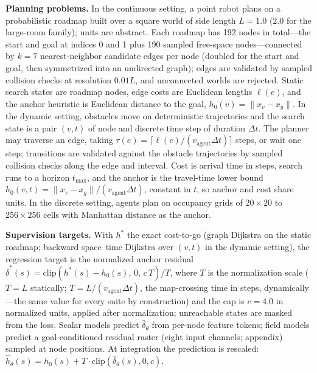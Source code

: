 \documentclass[letterpaper]{article} %
\begin{document}
\textbf{Planning problems.} In the continuous setting, a point robot plans on a probabilistic roadmap \citep[PRM;][]{kavraki1996prm} built over a square world of side length $L{=}1.0$ ($2.0$ for the large-room family); units are abstract. Each roadmap has 192 nodes in total---the start and goal at indices 0 and 1 plus 190 sampled free-space nodes---connected by $k{=}7$ nearest-neighbor candidate edges per node (doubled for the start and goal, then symmetrized into an undirected graph); edges are validated by sampled collision checks at resolution $0.01L$, and unconnected worlds are rejected. Static search states are roadmap nodes, edge costs are Euclidean lengths $\ell(e)$, and the anchor heuristic is Euclidean distance to the goal, $h_0(v) = \lVert x_v - x_g \rVert$. In the dynamic setting, obstacles move on deterministic trajectories and the search state is a pair $(v,t)$ of node and discrete time step of duration $\Delta t$. The planner may traverse an edge, taking $\tau(e) = \lceil \ell(e) / (v_{\mathrm{agent}} \Delta t) \rceil$ steps, or wait one step; transitions are validated against the obstacle trajectories by sampled collision checks along the edge and interval. Cost is arrival time in steps, search runs to a horizon $t_{\max}$, and the anchor is the travel-time lower bound $h_0(v,t) = \lVert x_v - x_g \rVert / (v_{\mathrm{agent}} \Delta t)$, constant in $t$, so anchor and cost share units. In the discrete setting, agents plan on occupancy grids of $20{\times}20$ to $256{\times}256$ cells with Manhattan distance as the anchor.

\textbf{Supervision targets.} With $h^{*}$ the exact cost-to-go (graph Dijkstra on the static roadmap; backward space--time Dijkstra over $(v,t)$ in the dynamic setting), the regression target is the normalized anchor residual $\bar\delta^{*}(s) = \mathrm{clip}\!\left(h^{*}(s) - h_0(s),\, 0,\, c\,T\right)/T$, where $T$ is the normalization scale ($T{=}L$ statically; $T = L/(v_{\mathrm{agent}}\Delta t)$, the map-crossing time in steps, dynamically---the same value for every suite by construction) and the cap is $c{=}4.0$ in normalized units, applied after normalization; unreachable states are masked from the loss. Scalar models predict $\bar\delta_\theta$ from per-node feature tokens; field models predict a goal-conditioned residual raster (eight input channels; appendix) sampled at node positions. At integration the prediction is rescaled: $\hat h_\theta(s) = h_0(s) + T \cdot \mathrm{clip}(\bar\delta_\theta(s), 0, c)$.
\end{document}
